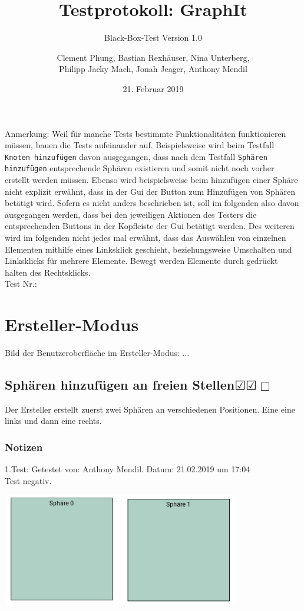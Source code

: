 \documentclass{scrartcl}
\title{Testprotokoll: GraphIt}
\subtitle{Black-Box-Test Version 1.0}  %
\author{Clement Phung, Bastian Rexhäuser, Nina Unterberg, \\ Philipp Jacky Mach, Jonah Jeager, Anthony Mendil}  %
\date{21. Februar 2019}  %
\newcommand{\subsectiont}[2]{\subsection[#1]{#1{\normalsize\normalfont #2}}}
\newcommand{\leer}{$\Box$}
\newcommand{\ok}{$\CheckedBox$}
\begin{document}
\maketitle
%

Anmerkung: Weil für manche Tests bestimmte Funktionalitäten funktionieren müssen, bauen die Tests aufeinander auf. Beispielsweise wird beim Testfall \texttt{Knoten hinzufügen} davon ausgegangen, dass nach dem Testfall \texttt{Sphären hinzufügen} entsprechende Sphären existieren und somit nicht noch vorher erstellt werden müssen. Ebenso wird beispielsweise beim hinzufügen einer Sphäre nicht explizit erwähnt, dass in der Gui der Button zum Hinzufügen von Sphären betätigt wird. Sofern es nicht anders beschrieben ist, soll im folgenden also davon ausgegangen werden, dass bei den jeweiligen Aktionen des Testers die entsprechenden Buttons in der Kopfleiste der Gui betätigt werden. Des weiteren wird im folgenden nicht jedes mal erwähnt, dass das Auswählen von einzelnen Elementen mithilfe eines Linksklick geschieht, beziehungsweise Umschalten und Linksklicks für mehrere Elemente. Bewegt werden Elemente durch gedrückt halten des Rechtsklicks. \\

\hfill Test Nr.: \setlength{\fboxsep}{1pt} %

\section{Ersteller-Modus}

Bild der Benutzeroberfläche im Ersteller-Modus:
...

\subsectiont{Sphären hinzufügen an freien Stellen}{\dotfill\ok\ok\leer}
Der Ersteller erstellt zuerst zwei Sphären an verschiedenen Positionen. Eine eine links und dann eine rechts.  
\subsubsection{Notizen}
1.Test: Getestet von: Anthony Mendil. Datum: 21.02.2019 um 17:04 \\
Test negativ. 
\begin{center}
\includegraphics[height=5cm]{1_1.PNG}
\end{center}
\end{document}
